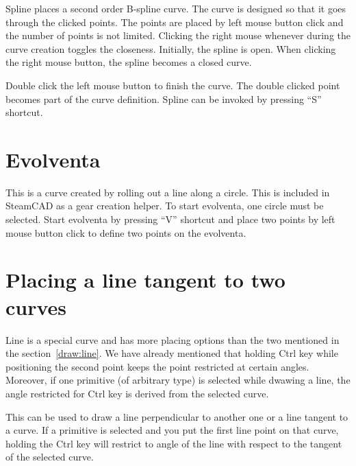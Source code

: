 Spline places a second order B-spline curve. The curve is designed so that it goes through
the clicked points. The points are placed by left mouse button click and the number of
points is not limited. Clicking the right mouse whenever during the curve creation toggles
the closeness. Initially, the spline is open. When clicking the right mouse button, the spline
becomes a closed curve.

Double click the left mouse button to finish the curve. The double clicked point becomes
part of the curve definition. Spline can be invoked by pressing ``S'' shortcut.

\section{Evolventa}

This is a curve created by rolling out a line along a circle. This is included in SteamCAD
as a gear creation helper. To start evolventa, one circle must be selected. Start evolventa
by pressing ``V'' shortcut and place two points by left mouse button click to define two
points on the evolventa.

\section{Placing a line tangent to two curves}

Line is a special curve and has more placing options than the two mentioned in the
section~\ref{draw:line}. We have already mentioned that holding Ctrl key while positioning
the second point keeps the point restricted at certain angles. Moreover, if one primitive
(of arbitrary type) is selected while dwawing a line, the angle restricted for Ctrl key
is derived from the selected curve.

This can be used to draw a line perpendicular to another one or a line tangent to a curve.
If a primitive is selected and you put the first line point on that curve, holding the Ctrl
key will restrict to angle of the line with respect to the tangent of the selected curve.

